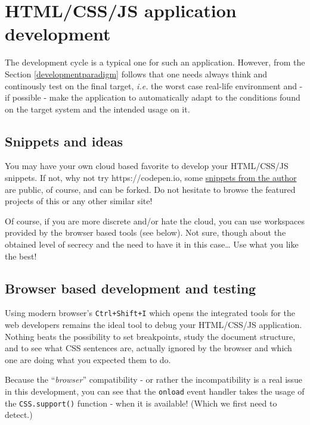 \documentclass[11pt]{article}
\begin{document}
    \hypertarget{htmlcssjs-application-development}{%
\section{HTML/CSS/JS application
development}\label{htmlcssjs-application-development}}

    The development cycle is a typical one for such an application. However,
from the Section \ref{developmentparadigm} follows that one needs always
think and continously test on the final target, \emph{i.e.} the worst
case real-life environment and - if possible - make the application to
automatically adapt to the conditions found on the target system and the
intended usage on it.

    \hypertarget{snippets-and-ideas}{%
\subsection{Snippets and ideas}\label{snippets-and-ideas}}

    You may have your own cloud based favorite to develop your HTML/CSS/JS
snippets. If not, why not try https://codepen.io, some
\href{https://codepen.io/petrim}{snippets from the author} are public,
of course, and can be forked. Do not hesitate to browse the featured
projects of this or any other similar site!

    Of course, if you are more discrete and/or hate the cloud, you can use
workspaces provided by the browser based tools (see below). Not sure,
though about the obtained level of secrecy and the need to have it in
this case\ldots{} Use what you like the best!

    \hypertarget{browser-based-development-and-testing}{%
\subsection{Browser based development and
testing}\label{browser-based-development-and-testing}}

    Using modern browser's \texttt{Ctrl+Shift+I} which opens the integrated
tools for the web developers remains the ideal tool to debug your
HTML/CSS/JS application. Nothing beats the possibility to set
breakpoints, study the document structure, and to see what CSS sentences
are, actually ignored by the browser and which one are doing what you
expected them to do.

    Because the ``\emph{browser}'' compatibility - or rather the
incompatibility is a real issue in this development, you can see that
the \texttt{onload} event handler takes the usage of the
\texttt{CSS.support()} function - when it is available! (Which we first
need to detect.)
\end{document}
